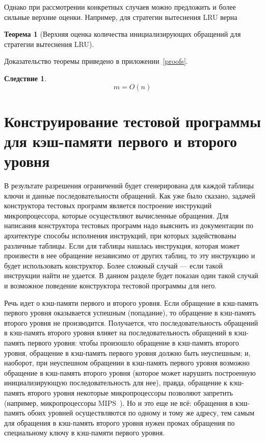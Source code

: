 \documentclass[14pt]{extreport}
\newtheorem{theorem}{Теорема}
\newtheorem*{sld}{Следствие}
\newcommand{\LRU}{\textsf{LRU}\xspace}
\begin{document}
Однако при рассмотрении конкретных случаев можно предложить и более сильные
верхние оценки. Например, для стратегии вытеснения \LRU верна

\begin{theorem}[Верхняя оценка количества инициализирующих обращений для
стратегии вытеснения
\LRU]\label{thm_mirror_lenth_lru} \UpperBoundLRUMirror
\end{theorem}
Доказательство теоремы приведено в приложении~\ref{proofs}.
\begin{sld}
      $$m = O(n)$$
\end{sld}


\section{Конструирование тестовой программы для кэш-памяти первого и второго
уровня}

В результате разрешения ограничений будет сгенерирована для каждой таблицы ключи
и данные последовательности обращений. Как уже было сказано, задачей
конструктора тестовых программ является построение инструкций микропроцессора,
которые осуществляют вычисленные обращения. Для написания конструктора тестовых
программ надо выяснить из документации по архитектуре способы исполнения
инструкций, при которых задействованы различные таблицы. Если для таблицы
нашлась инструкция, которая может произвести в нее обращение независимо от
других таблиц, то эту инструкцию и будет использовать конструктор. Более сложный
случай --- если такой инструкции найти не удается. В данном разделе будет
показан один такой случай и возможное поведение конструктора тестовой программы
для него.

Речь идет о кэш-памяти первого и второго уровня. Если обращение в кэш-память
первого уровня оказывается успешным (попадание), то обращение в кэш-память
второго уровня не производится. Получается, что последовательность обращений в
кэш-память второго уровня влияет на последовательность обращений в кэш-память
первого уровня: чтобы произошло обращение в кэш-память второго уровня, обращение
в кэш-память первого уровня должно быть неуспешным; и, наоборот, при неуспешном
обращении в кэш-память первого уровня возможно обращение в кэш-память второго
уровня (которое может нарушить построенную инициализирующую последовательность
для нее), правда, обращение к кэш-память второго уровня некоторые
микропроцессоры позволяют запретить (например, микропроцессоры
MIPS~\cite{MIPS64_III}). Но и это еще не всё: обращения в кэш-память обоих
уровней осуществляются по одному и тому же адресу, тем самым для обращения в
кэш-память второго уровня нужен промах обращения по специальному ключу в
кэш-памяти первого уровня.
\end{document}
